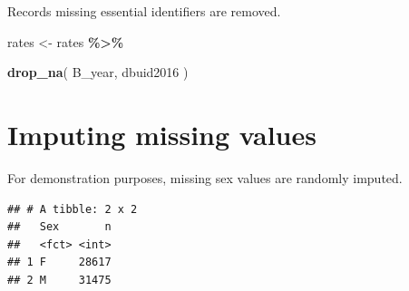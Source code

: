 \documentclass[
  11pt,
  oneside]{book}
\newenvironment{Shaded}{\begin{snugshade}}{\end{snugshade}}
\newcommand{\AttributeTok}[1]{\textcolor[rgb]{0.13,0.29,0.53}{#1}}
\newcommand{\ConstantTok}[1]{\textcolor[rgb]{0.56,0.35,0.01}{#1}}
\newcommand{\DecValTok}[1]{\textcolor[rgb]{0.00,0.00,0.81}{#1}}
\newcommand{\FunctionTok}[1]{\textcolor[rgb]{0.13,0.29,0.53}{\textbf{#1}}}
\newcommand{\NormalTok}[1]{#1}
\newcommand{\OtherTok}[1]{\textcolor[rgb]{0.56,0.35,0.01}{#1}}
\newcommand{\SpecialCharTok}[1]{\textcolor[rgb]{0.81,0.36,0.00}{\textbf{#1}}}
\newcommand{\StringTok}[1]{\textcolor[rgb]{0.31,0.60,0.02}{#1}}
\begin{document}
Records missing essential identifiers are removed.

\begin{Shaded}
\begin{Highlighting}[]
\NormalTok{rates }\OtherTok{\textless{}{-}}\NormalTok{ rates }\SpecialCharTok{\%\textgreater{}\%}
  
  \FunctionTok{drop\_na}\NormalTok{(}
\NormalTok{    B\_year,}
\NormalTok{    dbuid2016}
\NormalTok{  )}
\end{Highlighting}
\end{Shaded}

\section{Imputing missing values}\label{imputing-missing-values}

For demonstration purposes, missing sex values are randomly imputed.

\begin{Shaded}
\end{Shaded}

\begin{verbatim}
## # A tibble: 2 x 2
##   Sex       n
##   <fct> <int>
## 1 F     28617
## 2 M     31475
\end{verbatim}
\end{document}

